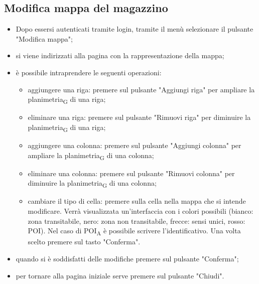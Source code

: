 \subsection{Modifica mappa del magazzino}
\begin{itemize}
    \item Dopo essersi autenticati tramite login, tramite il menù selezionare il pulsante "Modifica mappa";
    \item si viene indirizzati alla pagina con la rappresentazione della mappa;
    \item è possibile intraprendere le seguenti operazioni:
        \begin{itemize}
            \item aggiungere una riga: premere sul pulsante "Aggiungi riga" per ampliare la planimetria\textsubscript{G} di una riga;
            \item eliminare una riga: premere sul pulsante "Rimuovi riga" per diminuire la planimetria\textsubscript{G} di una riga;
            \item aggiungere una colonna: premere sul pulsante "Aggiungi colonna" per ampliare la planimetria\textsubscript{G} di una colonna;
            \item eliminare una colonna: premere sul pulsante "Rimuovi colonna" per diminuire la planimetria\textsubscript{G} di una colonna;
            \item cambiare il tipo di cella: premere sulla cella nella mappa che si intende modificare. Verrà visualizzata un'interfaccia con i colori possibili (bianco: zona transitabile, nero: zona non transitabile, frecce: sensi unici, rosso: POI). Nel caso di POI\textsubscript{A} è possibile scrivere l'identificativo. Una volta scelto premere sul tasto "Conferma".
        \end{itemize}
    \item quando si è soddisfatti delle modifiche premere sul pulsante "Conferma";
    \item per tornare alla pagina iniziale serve premere sul pulsante "Chiudi".
\end{itemize}

